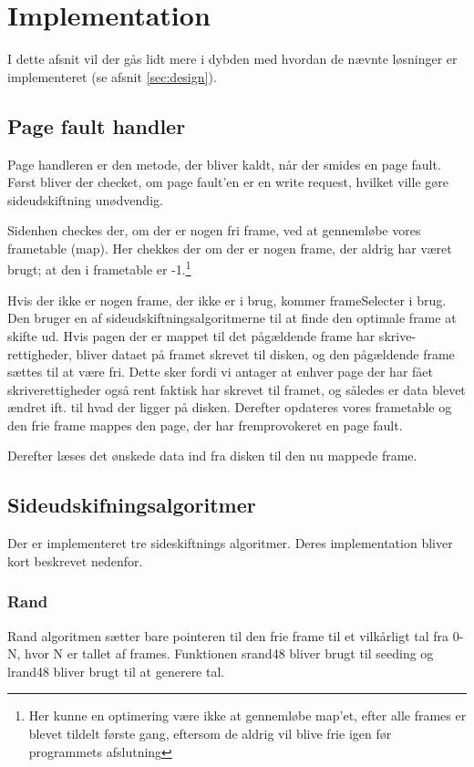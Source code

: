 \section{Implementation}
I dette afsnit vil der gås lidt mere i dybden med hvordan de nævnte løsninger er implementeret (se afsnit \ref{sec:design}).

\subsection{Page fault handler}
Page handleren er den metode, der bliver kaldt, når der smides en page fault. Først bliver der checket, om page fault'en er en write request, hvilket ville gøre sideudskiftning unødvendig.

Sidenhen checkes der, om der er nogen fri frame, ved at gennemløbe vores frametable (map). Her chekkes der om der er nogen frame, der aldrig har været brugt; at den i frametable er -1.\footnote{Her kunne en optimering være ikke at gennemløbe map'et, efter alle frames er blevet tildelt første gang, eftersom de aldrig vil blive frie igen før programmets afslutning}

Hvis der ikke er nogen frame, der ikke er i brug, kommer frameSelecter i brug. Den bruger en af sideudskiftningsalgoritmerne til at finde den optimale frame at skifte ud. Hvis pagen der er mappet til det pågældende frame har skrive-rettigheder, bliver dataet på framet skrevet til disken, og den pågældende frame sættes til at være fri. Dette sker fordi vi antager at enhver page der har fået skriverettigheder også rent faktisk har skrevet til framet, og således er data blevet ændret ift. til hvad der ligger på disken. Derefter opdateres vores frametable og den frie frame mappes den page, der har fremprovokeret en page fault.

Derefter læses det ønskede data ind fra disken til den nu mappede frame.

\subsection{Sideudskifningsalgoritmer}
Der er implementeret tre sideskiftnings algoritmer. Deres implementation bliver kort beskrevet nedenfor.

\subsubsection{Rand}
Rand algoritmen sætter bare pointeren til den frie frame til et vilkårligt tal fra 0-N, hvor N er tallet af frames. Funktionen srand48 bliver brugt til seeding og lrand48 bliver brugt til at generere tal.

